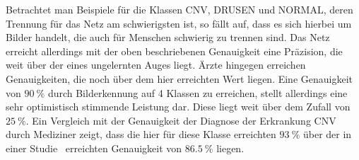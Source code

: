%
Betrachtet man Beispiele für die Klassen CNV, DRUSEN und NORMAL, deren
Trennung für das Netz am schwierigsten ist, so fällt auf, dass es sich hierbei
um Bilder handelt, die auch für Menschen schwierig zu trennen sind. Das Netz
erreicht allerdings mit der oben beschriebenen Genauigkeit eine Präzision, die
weit über der eines ungelernten Auges liegt. Ärzte hingegen erreichen
Genauigkeiten, die noch über dem hier erreichten Wert liegen.
\newpage
Eine Genauigkeit von $\SI{90}{\percent}$ durch Bilderkennung auf 4 Klassen zu
erreichen, stellt allerdings eine sehr optimistisch stimmende Leistung dar.
Diese liegt weit über dem Zufall von $\SI{25}{\percent}$.
Ein Vergleich mit der Genauigkeit der Diagnose der Erkrankung CNV durch
Mediziner zeigt, dass die hier für diese Klasse erreichten $\SI{93}{\percent}$
über der in einer Studie~\cite{CNV} erreichten Genauigkeit von
$\SI{86.5}{\percent}$ liegen.
%
